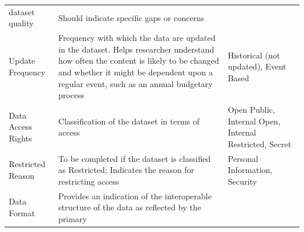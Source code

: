 \documentclass[
]{book}
\begin{document}
\begin{longtable}[]{@{}lll@{}}
\begin{minipage}[t]{0.35\columnwidth}
dataset quality\strut
\end{minipage} & \begin{minipage}[t]{0.35\columnwidth}\raggedright
Should indicate specific
gaps or concerns\strut
\end{minipage}\tabularnewline
\begin{minipage}[t]{0.22\columnwidth}\raggedright
Update
Frequency\strut
\end{minipage} & \begin{minipage}[t]{0.35\columnwidth}\raggedright
Frequency with which the
data are updated in the
dataset. Helps researcher
understand how often the
content is likely to be
changed and whether it
might be dependent upon a
regular event, such as an
annual budgetary process\strut
\end{minipage} & \begin{minipage}[t]{0.35\columnwidth}\raggedright
Historical (not updated),
Event Based\strut
\end{minipage}\tabularnewline
\begin{minipage}[t]{0.22\columnwidth}\raggedright
Data Access
Rights\strut
\end{minipage} & \begin{minipage}[t]{0.35\columnwidth}\raggedright
Classification of the
dataset in terms of
access\strut
\end{minipage} & \begin{minipage}[t]{0.35\columnwidth}\raggedright
Open Public, Internal
Open, Internal
Restricted, Secret\strut
\end{minipage}\tabularnewline
\begin{minipage}[t]{0.22\columnwidth}\raggedright
Restricted
Reason\strut
\end{minipage} & \begin{minipage}[t]{0.35\columnwidth}\raggedright
To be completed if the
dataset is classified as
Restricted; Indicates the
reason for restricting
access\strut
\end{minipage} & \begin{minipage}[t]{0.35\columnwidth}\raggedright
Personal Information,
Security\strut
\end{minipage}\tabularnewline
\begin{minipage}[t]{0.22\columnwidth}\raggedright
Data Format\strut
\end{minipage} & \begin{minipage}[t]{0.35\columnwidth}\raggedright
Provides an indication of
the interoperable
structure of the data as
reflected by the primary

\end{minipage}
\end{longtable}
\end{document}
